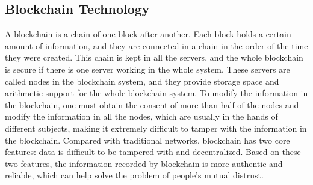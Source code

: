 \subsection{Blockchain Technology}
A blockchain is a chain of one block after another. Each block holds a certain amount of information, and they are connected in a chain in the order of the time they were created. This chain is kept in all the servers, and the whole blockchain is secure if there is one server working in the whole system. These servers are called nodes in the blockchain system, and they provide storage space and arithmetic support for the whole blockchain system. To modify the information in the blockchain, one must obtain the consent of more than half of the nodes and modify the information in all the nodes, which are usually in the hands of different subjects, making it extremely difficult to tamper with the information in the blockchain. Compared with traditional networks, blockchain has two core features: data is difficult to be tampered with and decentralized. Based on these two features, the information recorded by blockchain is more authentic and reliable, which can help solve the problem of people's mutual distrust.